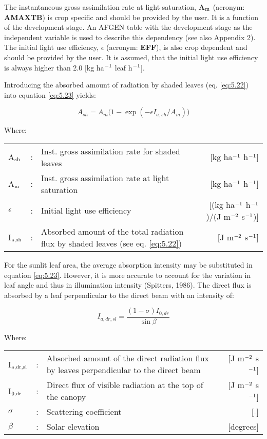 The instantaneous gross assimilation rate at light saturation, {\bf A$_{{\rm m}}$} (acronym: {\bf AMAXTB}) is
crop specific and should be provided by the user. It is a function of the development
stage. An AFGEN table with the development stage as the independent variable is used to
describe this dependency (see also Appendix 2). The initial light use efficiency, {\bf $\epsilon$}
(acronym: {\bf EFF}), is also crop dependent and should be provided by the user. It is
assumed, that the initial light use efficiency is always higher than 2.0 [kg ha$^{{\rm -1}}$ 
leaf h$^{{\rm -1}}$]. 

Introducing the absorbed amount of radiation by shaded leaves (eq. \ref{eq:5.22}) into 
equation \ref{eq:5.23} yields:

\begin{equation}
\label{eq:5.24}
A_{sh} = A_{m} \big(1-\exp({{-\epsilon I_{a,sh} }/{A_m}} ) \big)
\end{equation}

Where:\\[5pt]
\begin{tabularx}{\textwidth}{llXr}
A$_{{\rm sh}}$ &:& Inst. gross assimilation rate for shaded leaves  & 
    [kg ha$^{{\rm -1}}$ h$^{{\rm -1}}$]\\
A$_{{\rm m}}$ &:& Inst. gross assimilation rate at light saturation & 
    [kg ha$^{{\rm -1}}$ h$^{{\rm -1}}$]\\
$\epsilon$ &:& Initial light use efficiency  &  
    [(kg ha$^{{\rm -1}}$ h$^{{\rm -1}}$)/(J m$^{{\rm -2}}$ s$^{{\rm -1}}$)]\\
I$_{{\rm a,sh}}$ &:& Absorbed amount of the total radiation flux  by shaded leaves (see eq. \ref{eq:5.22})   &
     [J m$^{{\rm -2}}$ s$^{{\rm -1}}$]\\
\end{tabularx}

For the sunlit leaf area, the average absorption intensity may be substituted in equation
\ref{eq:5.23}. However, it is more accurate to account for the variation in leaf angle and thus in
illumination intensity (Spitters, 1986). The direct flux is absorbed by a leaf perpendicular
to the direct beam with an intensity of: 

\begin{equation}
\label{eq:5.25}
I_{a,dr,sl} = {\frac{(1-\sigma) I_{0,dr}}{\sin \beta }}
\end{equation}

Where:\\[5pt]
\begin{tabularx}{\textwidth}{llXr}
I$_{{\rm a,dr,sl}}$ &:& Absorbed amount of the direct radiation flux by leaves
   perpendicular to the direct beam    &    [J m$^{{\rm -2}}$ s$^{{\rm -1}}$]\\
I$_{{\rm 0,dr}}$ &:& Direct flux of visible radiation at the top of 
   the canopy &  [J m$^{{\rm -2}}$ s$^{{\rm -1}}$]\\
$\sigma$ &:& Scattering coefficient  &[-]\\
$\beta$ &:& Solar elevation   & [degrees]\\
\end{tabularx}

